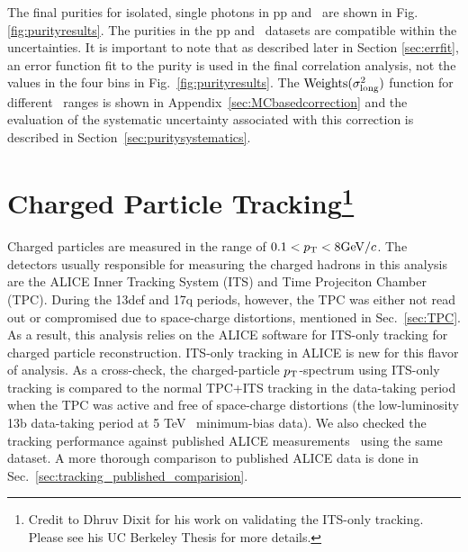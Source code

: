 The final purities for isolated, single photons in pp and \pPb~are shown in Fig. \ref{fig:purityresults}. The purities in the pp and \pPb~datasets are compatible within the uncertainties. It is important to note that as described later in Section \ref{sec:errfit}, an error function fit to the purity is used in the final correlation analysis, not the values in the four bins in Fig.~\ref{fig:purityresults}. The $\text{Weights}(\sigma^{2}_{\mathrm{long}})$ function for different \pt~ranges is shown in Appendix~\ref{sec:MCbasedcorrection} and the evaluation of the systematic uncertainty associated with this correction is described in Section~\ref{sec:puritysystematics}. 
\FloatBarrier



\section{Charged Particle Tracking\footnote{Credit to Dhruv Dixit for his work on validating the ITS-only tracking. Please see his UC Berkeley Thesis for more details.}}
\label{sec:tracking}
Charged particles are measured in the range of $0.1 < p_{\mathrm{T}} < 8 \mathrm{GeV}/c$. The detectors usually responsible for measuring the charged hadrons in this analysis are the ALICE Inner Tracking System (ITS) and Time Projeciton Chamber (TPC). During the 13def and 17q periods, however, the TPC was either not read out or compromised due to space-charge distortions, mentioned in Sec.~\ref{sec:TPC}. As a result, this analysis relies on the ALICE software for ITS-only tracking for charged particle reconstruction. ITS-only tracking in ALICE is new for this flavor of analysis. As a cross-check, the charged-particle $p_{\mathrm{T}}$-spectrum using ITS-only tracking is compared to the normal TPC+ITS tracking in the data-taking period when the TPC was active and free of space-charge distortions (the low-luminosity 13b data-taking period at 5 TeV \pPb~minimum-bias data). We also checked the tracking performance against published ALICE measurements~\cite{Acharya:2018qsh} using the same dataset. A more thorough comparison to published ALICE data is done in Sec.~\ref{sec:tracking_published_comparision}.


